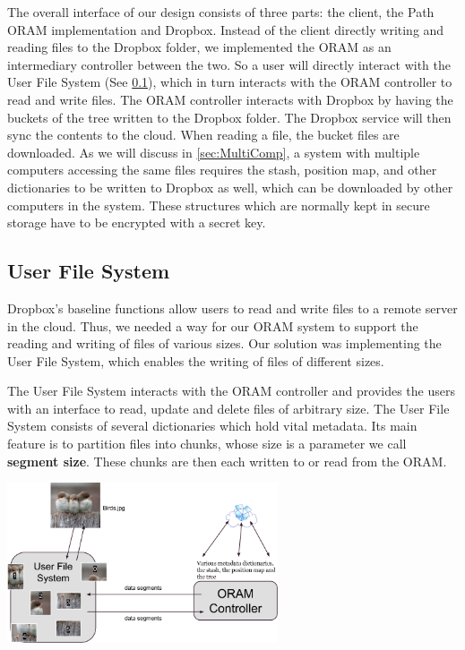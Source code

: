 \documentclass[conference]{IEEEtran}
\begin{document}
The overall interface of our design consists of three parts: the client, the Path ORAM implementation and Dropbox. Instead of the client directly writing and reading files to the Dropbox folder, we implemented the ORAM as an intermediary controller between the two. So a user will directly interact with the User File System (See \ref{sec:UFS}), which in turn interacts with the ORAM controller to read and write files. The ORAM controller interacts with Dropbox by having the buckets of the tree written to the Dropbox folder. The Dropbox service will then sync the contents to the cloud. When reading a file, the bucket files are downloaded. As we will discuss in \ref{sec:MultiComp}, a system with multiple computers accessing the same files requires the stash, position map, and other dictionaries to be written to Dropbox as well, which can be downloaded by other computers in the system. These structures which are normally kept in secure storage have to be encrypted with a secret key.

\subsection{User File System}

\label{sec:UFS}
Dropbox's baseline functions allow users to read and write files to a remote server in the cloud. Thus, we needed a way for our ORAM system to support the reading and writing of files of various sizes. Our solution was implementing the User File System, which enables the writing of files of different sizes. 

The User File System interacts with the ORAM controller and provides the users with an interface to read, update and delete files of arbitrary size. The User File System consists of several dictionaries which hold vital metadata. Its main feature is to partition files into chunks, whose size is a parameter we call {\bf segment size}. These chunks are then each written to or read from the ORAM.

\begin{center}
\noindent\includegraphics[width=8cm]{320.png}
\end{center}
\end{document}
